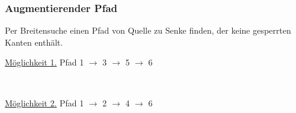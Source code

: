\documentclass{article}
\begin{document}
\subsubsection*{Augmentierender Pfad} 
Per Breitensuche einen Pfad von Quelle zu Senke finden, der keine gesperrten Kanten enthält.  \newline \newline   
\begin{minipage}{8cm} 
\underline{Möglichkeit 1.} \newline
Pfad 1 $\rightarrow$ 3 $\rightarrow$ 5 $\rightarrow$ 6

\end{minipage}
\begin{minipage}{1cm}
$\ $
\end{minipage}
\begin{minipage}{8cm}
\underline{Möglichkeit 2.} \newline
Pfad 1 $\rightarrow$ 2 $\rightarrow$ 4 $\rightarrow$ 6
\end{minipage}
\end{document}
